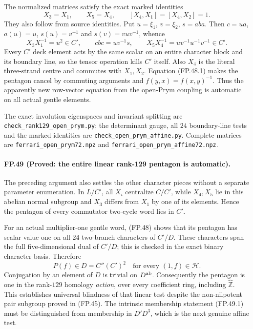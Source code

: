 The normalized matrices satisfy the exact marked identities
\[
 X_3=X_1,\qquad X_5=X_4,\qquad
 [X_4,X_1]=[X_4,X_2]=1.
 \tag{FP.48.1}
\]
They also follow from source identities. Put
$u=\xi_1$, $v=\xi_2$, $s=aba$. Then
$c=ua$, $a(u)=u$, $s(u)=v^{-1}$ and $s(v)=vuv^{-1}$, whence
\[
 X_3X_1^{-1}=u^2\in C',\qquad
 cbc=uv^{-1}s,\qquad
 X_5X_4^{-1}=uv^{-1}u^{-1}v^{-1}\in C'.
\]
Every $C'$ deck element acts by the same scalar on an
entire character block and its boundary line, so the tensor
operation kills $C'$ itself. Also $X_4$ is the literal
three-strand centre and commutes with $X_1,X_2$.
Equation (FP.48.1) makes the pentagon cancel by commuting
arguments and $f(y,x)=f(x,y)^{-1}$. Thus the apparently new
row-vector equation from the open-Prym coupling is automatic
on all actual gentle elements.

The exact involution eigenspaces and invariant splitting are
\texttt{check\_rank129\_open\_prym.py}; the determinant gauge,
all $24$ boundary-line tests and the marked identities are
\texttt{check\_open\_prym\_affine.py}. Complete matrices are
\texttt{ferrari\_open\_prym72.npz} and
\texttt{ferrari\_open\_prym\_affine72.npz}.

\paragraph{FP.49 (Proved: the entire linear rank-129 pentagon is automatic).}
The preceding argument also settles the other character
pieces without a separate parameter enumeration. In $L/C'$,
all $X_i$ centralize $C/C'$, while $X_4,X_5$ lie in this
abelian normal subgroup and $X_3$ differs from $X_1$ by
one of its elements. Hence the pentagon of every commutator
two-cycle word lies in $C'$.

For an actual multiplier-one gentle word, (FP.48) shows
that its pentagon has scalar value one on all $24$ two-branch
characters of $C'/D$. These characters span the full
five-dimensional dual of $C'/D$; this is checked in the exact
binary character basis. Therefore
\[
        \boxed{\quad P(f)\in D=C''(C')^2
                   \quad\text{for every }(1,f)\in\mathcal H.\quad}
 \tag{FP.49.1}
\]
Conjugation by an element of $D$ is trivial on $D^{\rm ab}$.
Consequently the pentagon is one in the rank-$129$ homology
\emph{action}, over every coefficient ring, including
$\widehat{\mathbb Z}$. This establishes universal blindness
of that linear test despite the non-nilpotent pair subgroup
proved in (FP.45). The intrinsic membership statement
(FP.49.1) must be distinguished from membership in
$D'D^3$, which is the next genuine affine test.

